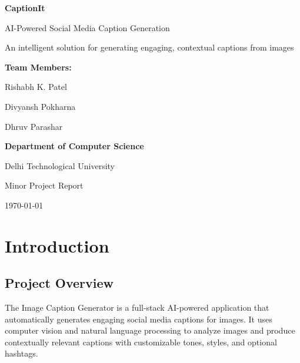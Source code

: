 \documentclass[12pt,a4paper]{report}
\begin{document}
\begin{titlepage}
    \centering
    \vspace*{2cm}
    {\Huge\bfseries CaptionIt\par}
    \vspace{1cm}
    {\Large AI-Powered Social Media Caption Generation\par}
    \vspace{1.5cm}
    {\large An intelligent solution for generating engaging, contextual captions from images\par}
    \vspace{3cm}
    
    {\large\textbf{Team Members:}\par}
    \vspace{0.5cm}
    {\large Rishabh K. Patel\par}
    \vspace{0.3cm}
    {\large Divyansh Pokharna\par}
    \vspace{0.3cm}
    {\large Dhruv Parashar\par}
    \vspace{3cm}
    
    {\large\textbf{Department of Computer Science}\par}
    \vspace{0.3cm}
    {\large Delhi Technological University\par}
    \vspace{3.5cm}
    
    {\large Minor Project Report\par}
    \vspace{0.5cm}
    {\large\today\par}
\end{titlepage}

\tableofcontents
\listoffigures
\listoftables

\chapter{Introduction}
\section{Project Overview}
The Image Caption Generator is a full-stack AI-powered application that automatically generates engaging social media captions for images. It uses computer vision and natural language processing to analyze images and produce contextually relevant captions with customizable tones, styles, and optional hashtags.
\end{document}
